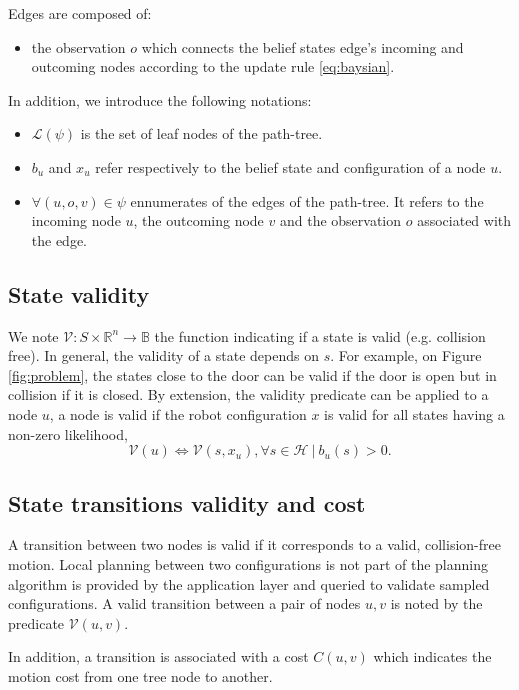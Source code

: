 \documentclass[letterpaper, 10 pt, conference]{ieeeconf}  %
\begin{document}
Edges are composed of:
\begin{itemize}
\item the observation $o$ which connects the belief states edge's incoming and outcoming nodes according to the update rule \ref{eq:baysian}.
\end{itemize}

In addition, we introduce the following notations:
\begin{itemize}
\item $\mathcal{L}(\psi)$ is the set of leaf nodes of the path-tree.
\item $b_u$ and $x_u$ refer respectively to the belief state and configuration of a node $u$.
\item $\forall (u, o, v) \in \psi$ ennumerates of the edges of the path-tree. It refers to the incoming node $u$, the outcoming node $v$ and the observation $o$ associated with the edge. 
\end{itemize}

\subsection{State validity}
We note $\mathcal{V}: S \times \mathbb{R}^n \rightarrow \mathbb{B}$ the function indicating if a state is valid (e.g. collision free). In general, the validity of a state depends on $s$. For example, on Figure \ref{fig:problem}, the states close to the door can be valid if the door is open but in collision if it is closed.
By extension, the validity predicate can be applied to a node $u$, a node is valid if the robot configuration $x$ is valid for all states having a non-zero likelihood,
\begin{equation}
\mathcal{V}(u) \iff \mathcal{V}(s, x_u), \forall s \in \mathcal{H}\ |\ b_u(s) > 0.
\end{equation}

\subsection{State transitions validity and cost}
A transition between two nodes is valid if it corresponds to a valid, collision-free motion. Local planning between two configurations is not part of the planning algorithm is provided by the application layer and queried to validate sampled configurations. A valid transition between a pair of nodes $u, v$ is noted by the predicate $\mathcal{V}(u, v)$. 

In addition, a transition is associated with a cost $C(u, v)$ which indicates the motion cost from one tree node to another.
\end{document}
